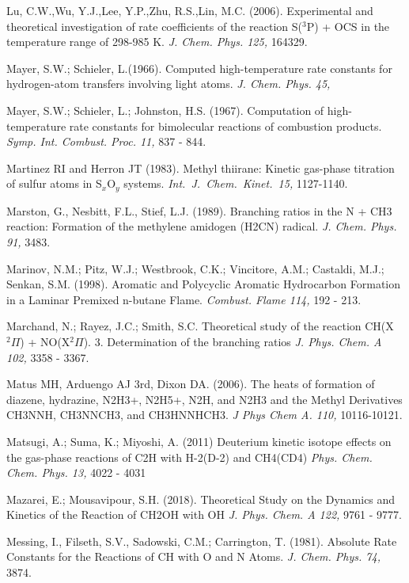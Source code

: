 \documentclass[12pt,landscape]{article}
\newcounter{reaction}
\begin{document}
Lu, C.W.,Wu, Y.J.,Lee, Y.P.,Zhu, R.S.,Lin, M.C. (2006).  Experimental and theoretical investigation of rate coefficients of the reaction S($^3$P) + OCS in the temperature range of 298-985 K.  {\em J. Chem. Phys. 125,} 164329.

Mayer, S.W.; Schieler, L.(1966). Computed high-temperature rate constants for hydrogen-atom transfers involving light atoms.
{\em  J. Chem. Phys. 45,}

Mayer, S.W.; Schieler, L.; Johnston, H.S. (1967). Computation of high-temperature rate constants for bimolecular reactions of combustion products. {\em Symp. Int. Combust. Proc. 11,} 837 - 844.

 Martinez RI and Herron JT (1983).  Methyl thiirane: Kinetic gas-phase titration of sulfur atoms in S$_x$O$_y$ systems.  {\em Int.\ J.\ Chem.\ Kinet.\ 15,} 1127-1140.

Marston, G., Nesbitt, F.L., Stief, L.J. (1989). Branching ratios in the N + CH3 reaction: Formation of the methylene amidogen (H2CN) radical.  {\em J. Chem. Phys. 91,} 3483.

Marinov, N.M.; Pitz, W.J.; Westbrook, C.K.; Vincitore, A.M.; Castaldi, M.J.; Senkan, S.M. (1998).
Aromatic and Polycyclic Aromatic Hydrocarbon Formation in a Laminar Premixed n-butane Flame.  {\em Combust. Flame 114,} 192 - 213.

Marchand, N.; Rayez, J.C.; Smith, S.C.
Theoretical study of the reaction CH(X$^2\Pi$) + NO(X$^2\Pi$). 3. Determination of the branching ratios
{\em J. Phys. Chem. A 102,} 3358 - 3367.

Matus MH, Arduengo AJ 3rd, Dixon DA. (2006).  The heats of formation of diazene, hydrazine, N2H3+, N2H5+, N2H, and N2H3 and the Methyl Derivatives CH3NNH, CH3NNCH3, and CH3HNNHCH3. {\em J Phys Chem A. 110,} 10116-10121.

Matsugi, A.; Suma, K.; Miyoshi, A. (2011)
Deuterium kinetic isotope effects on the gas-phase reactions of C2H with H-2(D-2) and CH4(CD4)
{\em Phys. Chem. Chem. Phys. 13,}  4022 - 4031

Mazarei, E.; Mousavipour, S.H. (2018).  Theoretical Study on the Dynamics and Kinetics of the Reaction of CH2OH with OH
{\em  J. Phys. Chem. A 122,}  9761 - 9777.

Messing, I., Filseth, S.V., Sadowski, C.M.; Carrington, T. (1981). Absolute Rate Constants for the Reactions of CH with O and N Atoms.  {\em J. Chem. Phys. 74,} 3874.
\end{document}
